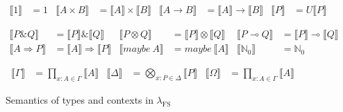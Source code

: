 \documentclass[runningheads]{llncs}
\newcommand\fslang{\ensuremath{\lambda_{\mathrm{FS}}}}
\newcommand\den[1]{\llbracket{#1}\rrbracket}
\newcommand\<\:                 %
\newcommand\lto\multimap        %
\newcommand\fto\Rightarrow
\newcommand\with{\mathbin{\&}}
\newcommand\ox\otimes
\newcommand\typename\textit
\newcommand\maybe{\typename{maybe}}
\newcommand\maybeof[1]{\ensuremath{\maybe~{#1}}}
\newcommand\G{\mathrm{\Gamma}}
\newcommand\D{\mathrm{\Delta}}
\renewcommand\O{\mathrm{\Omega}}
\newcommand\of{\mathbin{:}}
\newcommand\hyp[2]{{#1} \of {#2}}
\newcommand\nat{\mathbb{N}}
\newcommand\natz{\ensuremath{\nat_0}}
\renewcommand\G\Gamma
\renewcommand\D\Delta
\renewcommand\O\Omega
\begin{document}
\begin{figure}[p]
  \begin{align*}
    \den{1} &= 1 & \den{A \times B} &= \den{A} \times \den{B} & \den{A \to B} &= \den{A} \to \den{B}
    &
    \den{P} &= U \den{P}
  \end{align*}

  \begin{align*}
    \den{P \with Q} &= \den{P} \with \den{Q} &
    \den{P \ox Q} &= \den{P} \ox \den{Q} &
    \den{P \lto Q} &= \den{P} \lto \den{Q}\\
    \den{A \fto P} &= \den{A} \fto \den{P} &
    \den{\maybeof A} &= \maybeof{\den{A}} &
    \den{\natz} &= \natz
  \end{align*}

  \begin{align*}
    \den{\G} &= \prod_{\hyp x A \in \G} \den{A}
    &
    \den{\D} &= \bigotimes_{\hyp x P \in \D} \den{P}
    &
    \den{\O} &= \prod_{\hyp x A \in \G} \den{A}
  \end{align*}

  \caption{Semantics of types and contexts in \fslang}
  \label{fig:type-context-semantics}
\end{figure}

\newcommand\g\gamma
\renewcommand\d\delta
\renewcommand\o\omega
\newcommand\Den[1]{\left\llbracket{#1}\right\rrbracket}
\end{document}
